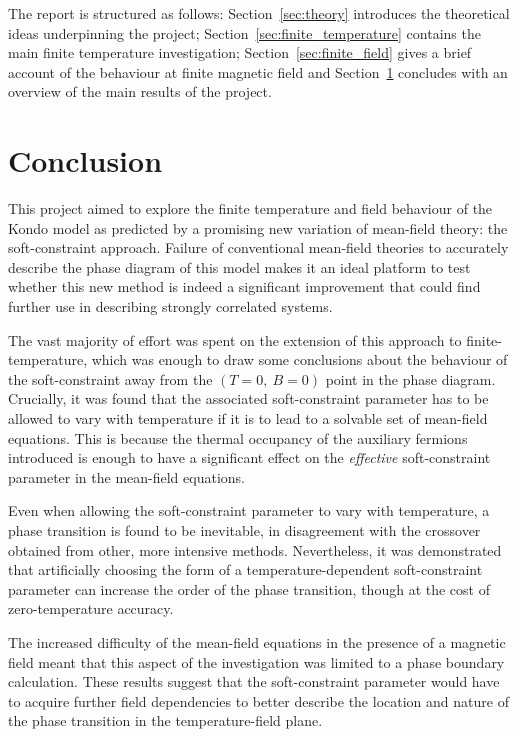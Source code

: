 \documentclass[12pt]{article}
\begin{document}
The report is structured as follows: Section~\ref{sec:theory} introduces the theoretical ideas underpinning the project; Section~\ref{sec:finite_temperature} contains the main finite temperature investigation; Section~\ref{sec:finite_field} gives a brief account of the behaviour at finite magnetic field and Section~\ref{sec:conclusion} concludes with an overview of the main results of the project.








\section{Conclusion}
\label{sec:conclusion}

This project aimed to explore the finite temperature and field behaviour of the Kondo model as predicted by a promising new variation of mean-field theory: the soft-constraint approach. Failure of conventional mean-field theories to accurately describe the phase diagram of this model makes it an ideal platform to test whether this new method is indeed a significant improvement that could find further use in describing strongly correlated systems.

The vast majority of effort was spent on the extension of this approach to finite-temperature, which was enough to draw some conclusions about the behaviour of the soft-constraint away from the $ (T = 0,~B = 0) $ point in the phase diagram. Crucially, it was found that the associated soft-constraint parameter  has to be allowed to vary with temperature if it is to lead to a solvable set of mean-field equations. This is because the thermal occupancy of the auxiliary fermions introduced is enough to have a significant effect on the \emph{effective} soft-constraint parameter in the mean-field equations.

Even when allowing the soft-constraint parameter to vary with temperature, a phase transition is found to be inevitable, in disagreement with the crossover obtained from other, more intensive methods. Nevertheless, it was demonstrated that artificially choosing the form of a temperature-dependent soft-constraint parameter can increase the order of the phase transition, though at the cost of zero-temperature accuracy.

The increased difficulty of the mean-field equations in the presence of a magnetic field meant that this aspect of the investigation was limited to a phase boundary calculation. These results suggest that the soft-constraint parameter would have to acquire further field dependencies to better describe the location and nature of the phase transition in the temperature-field plane.
\end{document}
